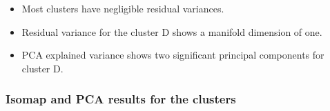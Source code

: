 \documentclass[svgnames, table, smaller]{beamer}
\begin{document}
\begin{frame}

  \begin{itemize}
  \item Most clusters have negligible residual variances.
  \item Residual variance for the cluster D shows a manifold dimension of one.
  \item PCA explained variance shows two significant principal components
    for cluster D.
  \end{itemize}

  \frametitle{Isomap and PCA results for the clusters}

  \begin{figure}[ht]
    \begin{center}
      \label{gt11vars}
    \end{center}
  \end{figure}


\end{frame}
\end{document}
